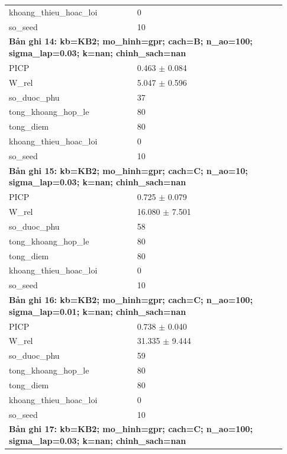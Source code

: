 \begin{longtable}{p{0.43\linewidth}p{0.50\linewidth}}
khoang\_\allowbreak thieu\_\allowbreak hoac\_\allowbreak loi & 0 \\
so\_\allowbreak seed & 10 \\
\midrule
\multicolumn{2}{p{0.95\linewidth}}{\textbf{Bản ghi 14: kb=KB2; mo\_hinh=gpr; cach=B; n\_ao=100; sigma\_lap=0.03; k=nan; chinh\_sach=nan}} \\
PICP & 0.463 $\pm$ 0.084 \\
W\_\allowbreak rel & 5.047 $\pm$ 0.596 \\
so\_\allowbreak duoc\_\allowbreak phu & 37 \\
tong\_\allowbreak khoang\_\allowbreak hop\_\allowbreak le & 80 \\
tong\_\allowbreak diem & 80 \\
khoang\_\allowbreak thieu\_\allowbreak hoac\_\allowbreak loi & 0 \\
so\_\allowbreak seed & 10 \\
\midrule
\multicolumn{2}{p{0.95\linewidth}}{\textbf{Bản ghi 15: kb=KB2; mo\_hinh=gpr; cach=C; n\_ao=10; sigma\_lap=0.03; k=nan; chinh\_sach=nan}} \\
PICP & 0.725 $\pm$ 0.079 \\
W\_\allowbreak rel & 16.080 $\pm$ 7.501 \\
so\_\allowbreak duoc\_\allowbreak phu & 58 \\
tong\_\allowbreak khoang\_\allowbreak hop\_\allowbreak le & 80 \\
tong\_\allowbreak diem & 80 \\
khoang\_\allowbreak thieu\_\allowbreak hoac\_\allowbreak loi & 0 \\
so\_\allowbreak seed & 10 \\
\midrule
\multicolumn{2}{p{0.95\linewidth}}{\textbf{Bản ghi 16: kb=KB2; mo\_hinh=gpr; cach=C; n\_ao=100; sigma\_lap=0.01; k=nan; chinh\_sach=nan}} \\
PICP & 0.738 $\pm$ 0.040 \\
W\_\allowbreak rel & 31.335 $\pm$ 9.444 \\
so\_\allowbreak duoc\_\allowbreak phu & 59 \\
tong\_\allowbreak khoang\_\allowbreak hop\_\allowbreak le & 80 \\
tong\_\allowbreak diem & 80 \\
khoang\_\allowbreak thieu\_\allowbreak hoac\_\allowbreak loi & 0 \\
so\_\allowbreak seed & 10 \\
\midrule
\multicolumn{2}{p{0.95\linewidth}}{\textbf{Bản ghi 17: kb=KB2; mo\_hinh=gpr; cach=C; n\_ao=100; sigma\_lap=0.03; k=nan; chinh\_sach=nan}} \\

\end{longtable}
